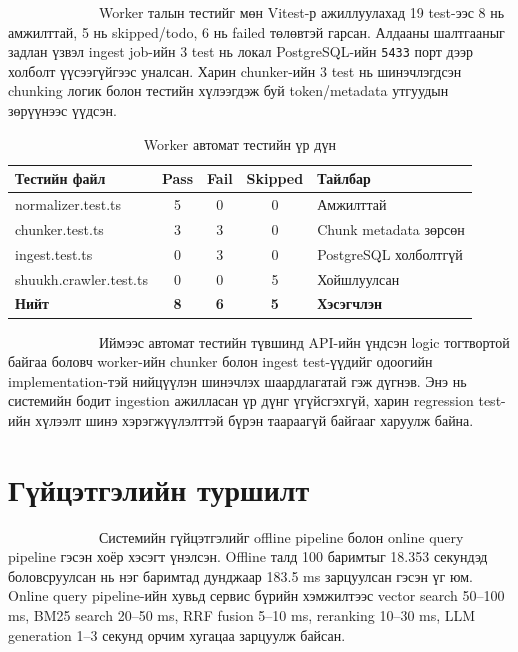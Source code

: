 \documentclass[12pt,A4]{report}
\begin{document}
\ \ \ \ \ \ \ \ \  \ \ \ \ Worker талын тестийг мөн Vitest-р ажиллуулахад
19 test-ээс 8 нь амжилттай, 5 нь skipped/todo, 6 нь failed төлөвтэй
гарсан. Алдааны шалтгааныг задлан үзвэл ingest job-ийн 3 test нь
локал PostgreSQL-ийн \texttt{5433} порт дээр холболт үүсээгүйгээс
уналсан. Харин chunker-ийн 3 test нь шинэчлэгдсэн chunking логик
болон тестийн хүлээгдэж буй token/metadata утгуудын зөрүүнээс үүдсэн.

\begin{table}[H]
\renewcommand{\tablename}{Хүснэгт}
\centering
\caption{Worker автомат тестийн үр дүн}
\begin{tabular}{|l|c|c|c|l|}
\hline
\textbf{Тестийн файл} & \textbf{Pass} & \textbf{Fail} & \textbf{Skipped} & \textbf{Тайлбар} \\
\hline
normalizer.test.ts & 5 & 0 & 0 & Амжилттай \\
chunker.test.ts & 3 & 3 & 0 & Chunk metadata зөрсөн \\
ingest.test.ts & 0 & 3 & 0 & PostgreSQL холболтгүй \\
shuukh.crawler.test.ts & 0 & 0 & 5 & Хойшлуулсан \\
\hline
\textbf{Нийт} & \textbf{8} & \textbf{6} & \textbf{5} & \textbf{Хэсэгчлэн} \\
\hline
\end{tabular}
\label{tab:worker_test_result}
\end{table}

\ \ \ \ \ \ \ \ \  \ \ \ \ Иймээс автомат тестийн түвшинд API-ийн
үндсэн logic тогтвортой байгаа боловч worker-ийн chunker болон ingest
test-үүдийг одоогийн implementation-тэй нийцүүлэн шинэчлэх шаардлагатай
гэж дүгнэв. Энэ нь системийн бодит ingestion ажилласан үр дүнг үгүйсгэхгүй,
харин regression test-ийн хүлээлт шинэ хэрэгжүүлэлттэй бүрэн таараагүй
байгааг харуулж байна.

\section{Гүйцэтгэлийн туршилт}

\ \ \ \ \ \ \ \ \  \ \ \ \ Системийн гүйцэтгэлийг offline pipeline
болон online query pipeline гэсэн хоёр хэсэгт үнэлсэн. Offline талд
100 баримтыг 18.353 секундэд боловсруулсан нь нэг баримтад дунджаар
183.5 ms зарцуулсан гэсэн үг юм. Online query pipeline-ийн хувьд
сервис бүрийн хэмжилтээс vector search 50--100 ms, BM25 search
20--50 ms, RRF fusion 5--10 ms, reranking 10--30 ms, LLM generation
1--3 секунд орчим хугацаа зарцуулж байсан.
\end{document}
